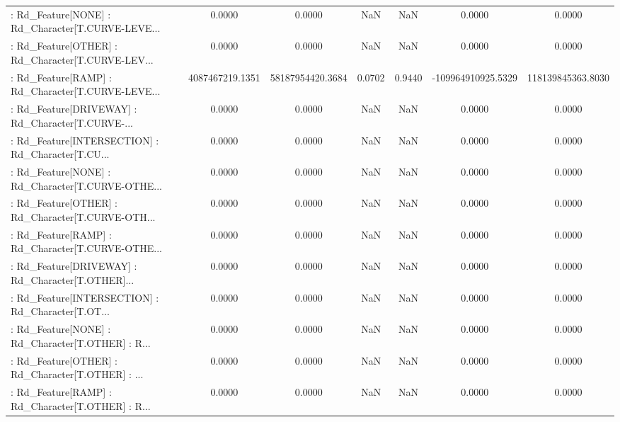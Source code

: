 \begin{longtable}{p{4cm}cccccc}
 : Rd\_Feature[NONE] : Rd\_Character[T.CURVE-LEVE... &            0.0000 &            0.0000 &     NaN &          NaN &             0.0000 &            0.0000 \\
 : Rd\_Feature[OTHER] : Rd\_Character[T.CURVE-LEV... &            0.0000 &            0.0000 &     NaN &          NaN &             0.0000 &            0.0000 \\
 : Rd\_Feature[RAMP] : Rd\_Character[T.CURVE-LEVE... &   4087467219.1351 &  58187954420.3684 &  0.0702 &       0.9440 & -109964910925.5329 & 118139845363.8030 \\
 : Rd\_Feature[DRIVEWAY] : Rd\_Character[T.CURVE-... &            0.0000 &            0.0000 &     NaN &          NaN &             0.0000 &            0.0000 \\
 : Rd\_Feature[INTERSECTION] : Rd\_Character[T.CU... &            0.0000 &            0.0000 &     NaN &          NaN &             0.0000 &            0.0000 \\
 : Rd\_Feature[NONE] : Rd\_Character[T.CURVE-OTHE... &            0.0000 &            0.0000 &     NaN &          NaN &             0.0000 &            0.0000 \\
 : Rd\_Feature[OTHER] : Rd\_Character[T.CURVE-OTH... &            0.0000 &            0.0000 &     NaN &          NaN &             0.0000 &            0.0000 \\
 : Rd\_Feature[RAMP] : Rd\_Character[T.CURVE-OTHE... &            0.0000 &            0.0000 &     NaN &          NaN &             0.0000 &            0.0000 \\
 : Rd\_Feature[DRIVEWAY] : Rd\_Character[T.OTHER]... &            0.0000 &            0.0000 &     NaN &          NaN &             0.0000 &            0.0000 \\
 : Rd\_Feature[INTERSECTION] : Rd\_Character[T.OT... &            0.0000 &            0.0000 &     NaN &          NaN &             0.0000 &            0.0000 \\
 : Rd\_Feature[NONE] : Rd\_Character[T.OTHER] : R... &            0.0000 &            0.0000 &     NaN &          NaN &             0.0000 &            0.0000 \\
 : Rd\_Feature[OTHER] : Rd\_Character[T.OTHER] : ... &            0.0000 &            0.0000 &     NaN &          NaN &             0.0000 &            0.0000 \\
 : Rd\_Feature[RAMP] : Rd\_Character[T.OTHER] : R... &            0.0000 &            0.0000 &     NaN &          NaN &             0.0000 &            0.0000 \\

\end{longtable}
